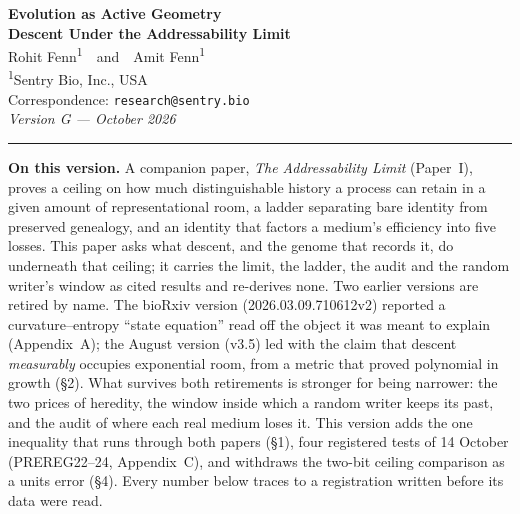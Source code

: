 \documentclass[11pt]{article}
\begin{document}
\thispagestyle{empty}

\begin{center}
{\LARGE\bfseries Evolution as Active Geometry}\\[4pt]
{\Large\bfseries Descent Under the Addressability Limit}\\[16pt]
{\large Rohit Fenn\textsuperscript{1}\ \ and\ \ Amit Fenn\textsuperscript{1}}\\[4pt]
{\small\textsuperscript{1}Sentry Bio, Inc., USA}\\[2pt]
{\small Correspondence: \texttt{research@sentry.bio}}\\[2pt]
{\small\itshape Version G --- October 2026}
\end{center}

\vspace{6pt}\noindent\rule{\textwidth}{0.4pt}\vspace{4pt}

\footnotesize
\noindent\textbf{On this version.} A companion paper, \emph{The Addressability Limit} (Paper~I), proves a ceiling on how much distinguishable history a process can retain in a given amount of representational room, a ladder separating bare identity from preserved genealogy, and an identity that factors a medium's efficiency into five losses. This paper asks what descent, and the genome that records it, do underneath that ceiling; it carries the limit, the ladder, the audit and the random writer's window as cited results and re-derives none. Two earlier versions are retired by name. The bioRxiv version (2026.03.09.710612v2) reported a curvature--entropy ``state equation'' read off the object it was meant to explain (Appendix~A); the August version (v3.5) led with the claim that descent \emph{measurably} occupies exponential room, from a metric that proved polynomial in growth (\S2). What survives both retirements is stronger for being narrower: the two prices of heredity, the window inside which a random writer keeps its past, and the audit of where each real medium loses it. This version adds the one inequality that runs through both papers (\S1), four registered tests of 14 October (PREREG22--24, Appendix~C), and withdraws the two-bit ceiling comparison as a units error (\S4). Every number below traces to a registration written before its data were read.\normalsize
\end{document}
